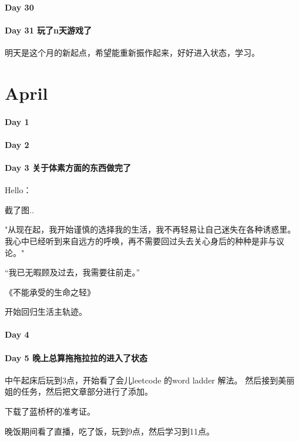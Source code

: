 \documentclass[UTF8,a4paper,8pt]{ctexart}
\begin{document}
 	 \paragraph{Day 30      \quad     }
 	 \paragraph{Day 31  玩了n天游戏了    \quad     }
	 	 明天是这个月的新起点，希望能重新振作起来，好好进入状态，学习。
 	 
 \section{April}
 	 \paragraph{Day 1       \quad     }
 	 \paragraph{Day 2       \quad     }
 	 \paragraph{Day 3  关于体素方面的东西做完了     \quad     }
	 	 Hello：
	 	 
	 	 截了图..
	 	 
	 	 "从现在起，我开始谨慎的选择我的生活，我不再轻易让自己迷失在各种诱惑里。 我心中已经听到来自远方的呼唤，再不需要回过头去关心身后的种种是非与议论。"
	 	 
	 	 “我已无暇顾及过去，我需要往前走。”
	 	 
	 	 《不能承受的生命之轻》
	 	 
	 	 开始回归生活主轨迹。
 	 \paragraph{Day 4       \quad     }
	 	 
 	 \paragraph{Day 5  晚上总算拖拖拉拉的进入了状态     \quad     }
	 	 中午起床后玩到3点，开始看了会儿leetcode 的word ladder 解法。 然后接到美丽姐的任务，然后把文章部分进行了添加。
	 	 
	 	 下载了蓝桥杯的准考证。
	 	 
	 	 晚饭期间看了直播，吃了饭，玩到9点，然后学习到11点。
 	 
\end{document}
